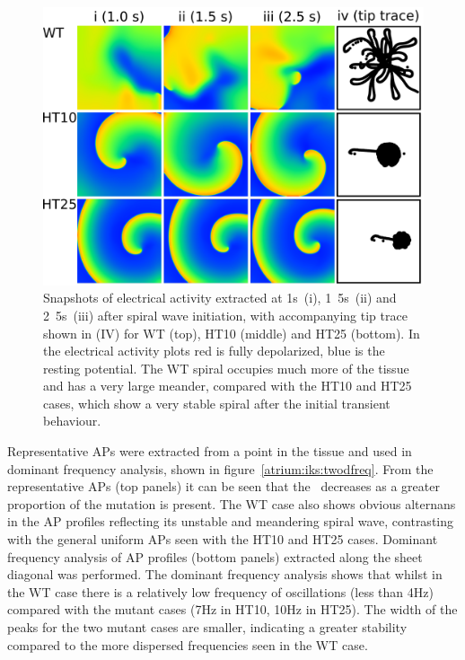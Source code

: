 \begin{figure}
\includegraphics{figures/atrium/iks/2Dplots}
\caption[2D Re-entry under S140G conditions]{
\label{atrium:iks:twodframes}
Snapshots of electrical activity extracted at \unit{1}{s}\ (i), \unit{1.5}{s}\
(ii) and \unit{2.5}{s}\ (iii) after spiral wave initiation, with accompanying
tip trace shown in (IV) for WT (top), HT10 (middle) and HT25 (bottom).  In the
electrical activity plots red is fully depolarized, blue is the resting
potential.  The WT spiral occupies much more of the tissue and has a very large
meander, compared with the HT10 and HT25 cases, which show a very stable spiral
after the initial transient behaviour.
}
\end{figure}

Representative APs were extracted from a point in the tissue and used in
dominant frequency analysis, shown in figure~\ref{atrium:iks:twodfreq}.
From the representative APs (top panels) it can be seen that the \apd\ decreases
as a greater proportion of the mutation is present.
The WT case also shows obvious alternans in the AP profiles reflecting its
unstable and meandering spiral wave, contrasting with the general uniform APs
seen with the HT10 and HT25 cases.
Dominant frequency analysis of AP profiles (bottom panels) extracted along the
sheet diagonal was performed.
The dominant frequency analysis shows that whilst in the WT case there is a
relatively low frequency of oscillations (less than \unit{4}{Hz}) compared with
the mutant cases (\unit{7}{Hz} in HT10, \unit{10}{Hz} in HT25).
The width of the peaks for the two mutant cases are smaller, indicating a
greater stability compared to the more dispersed frequencies seen in the WT
case.

